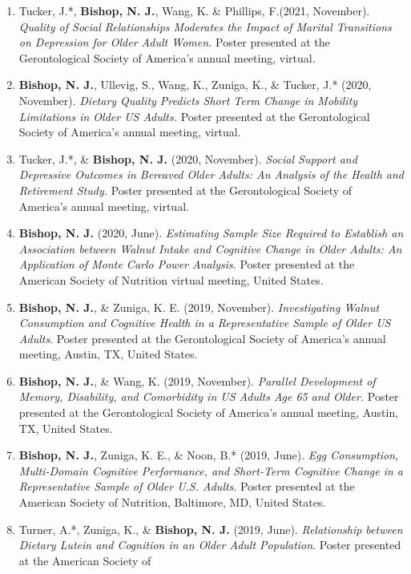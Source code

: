 \documentclass[
]{article}
\begin{document}
\begin{enumerate}
\def\labelenumi{\arabic{enumi}.}
\item
  Tucker, J.*, \textbf{Bishop, N. J.}, Wang, K. \& Phillips, F.(2021,
  November). \emph{Quality of Social Relationships Moderates the Impact
  of Marital Transitions on Depression for Older Adult Women.} Poster
  presented at the Gerontological Society of America's annual meeting,
  virtual\emph{.}
\item
  \textbf{Bishop, N. J.}, Ullevig, S., Wang, K., Zuniga, K., \& Tucker,
  J.* (2020, November). \emph{Dietary Quality Predicts Short Term Change
  in Mobility Limitations in Older US Adults.} Poster presented at the
  Gerontological Society of America's annual meeting, virtual.
\item
  Tucker, J.*, \& \textbf{Bishop, N. J.} (2020, November). \emph{Social
  Support and Depressive Outcomes in Bereaved Older Adults: An Analysis
  of the Health and Retirement Study.} Poster presented at the
  Gerontological Society of America's annual meeting, virtual.
\item
  \textbf{Bishop, N. J.} (2020, June). \emph{Estimating Sample Size
  Required to Establish an Association between Walnut Intake and
  Cognitive Change in Older Adults: An Application of Monte Carlo Power
  Analysis}. Poster presented at the American Society of Nutrition
  virtual meeting, United States.
\item
  \textbf{Bishop, N. J.}, \& Zuniga, K. E. (2019, November).
  \emph{Investigating Walnut Consumption and Cognitive Health in a
  Representative Sample of Older US Adults}. Poster presented at the
  Gerontological Society of America's annual meeting, Austin, TX, United
  States.
\item
  \textbf{Bishop, N. J.}, \& Wang, K. (2019, November). \emph{Parallel
  Development of Memory, Disability, and Comorbidity in US Adults Age 65
  and Older.} Poster presented at the Gerontological Society of
  America's annual meeting, Austin, TX, United States.
\item
  \textbf{Bishop, N. J.}, Zuniga, K. E., \& Noon, B.* (2019, June).
  \emph{Egg Consumption, Multi-Domain Cognitive Performance, and
  Short-Term Cognitive Change in a Representative Sample of Older U.S.
  Adults}. Poster presented at the American Society of Nutrition,
  Baltimore, MD, United States.
\item
  Turner, A.*, Zuniga, K., \& \textbf{Bishop, N. J.} (2019, June).
  \emph{Relationship between Dietary Lutein and Cognition in an Older
  Adult Population}. Poster presented at the American Society of

\end{enumerate}
\end{document}
